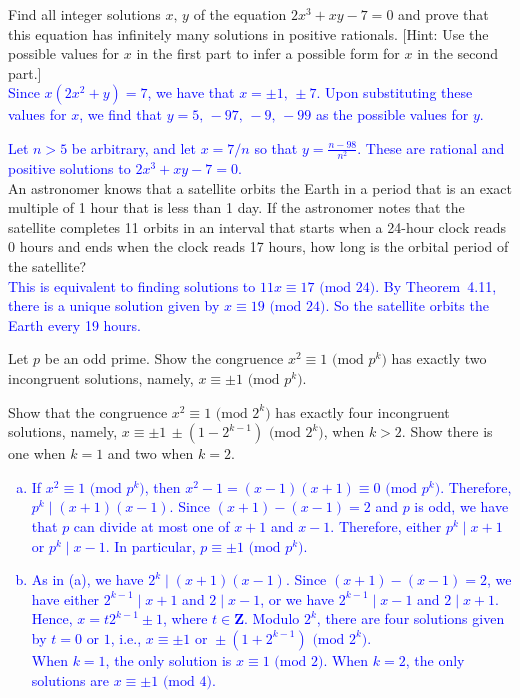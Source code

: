 \documentclass[a4paper,11pt]{article}
\theoremstyle{mythm}
\theoremstyle{mydef}
\newcommand{\blue}[1]{\textcolor{blue}{#1}}
\renewcommand{\pmod}[1]{\text{ (mod $#1$)}}
\newcommand{\Z}{\mathbf{Z}}
\begin{document}
 Find all integer solutions $x,\,y$ of the equation
$2x^3+xy-7=0$ and prove that this equation has infinitely many solutions in
positive rationals. [Hint: Use the possible values for $x$ in the first part to
infer a possible form for $x$ in the second part.] \\

\blue{Since $x(2x^2+y)=7$, we have that $x=\pm1,\,\pm7$. Upon substituting
  these values for $x$, we find that $y=5,\,-97,\,-9,\,-99$ as the possible
  values for $y$.}

\blue{Let $n>5$ be arbitrary, and let $x=7/n$ so that $y=\frac{n-98}{n^2}$.
  These are rational and positive solutions to $2x^3+xy-7=0$.} \\

 An astronomer knows that a satellite orbits the
Earth in a period that is an exact multiple of 1 hour that is less than 1 day.
If the astronomer notes that the satellite completes 11 orbits in an interval
that starts when a 24-hour clock reads 0 hours and ends when the clock reads 17
hours, how long is the orbital period of the satellite? \\

\blue{This is equivalent to finding solutions to $11x \equiv 17 \pmod{24}$. By
  Theorem~4.11, there is a unique solution given by $x \equiv 19 \pmod{24}$. So
  the satellite orbits the Earth every 19 hours.} \\

\begin{enumerate*}[{\bf (a)}]
\item Let $p$ be an odd prime. Show the congruence $x^2 \equiv 1\pmod{p^k}$ has
  exactly two incongruent solutions, namely, $x \equiv \pm1 \pmod{p^k}$.
\item Show that the congruence $x^2 \equiv 1 \pmod{2^k}$ has exactly four
  incongruent solutions, namely, $x \equiv \pm1\,\pm(1-2^{k-1}) \pmod{2^k}$,
  when $k>2$. Show there is one when $k=1$ and two when $k=2$.
\end{enumerate*}

\blue{
  \begin{enumerate}[(a)]
  \item If $x^2 \equiv 1 \pmod{p^k}$, then $x^2-1 = (x-1)(x+1) \equiv 0
    \pmod{p^k}$. Therefore, $p^k \mid (x+1)(x-1)$. Since $(x+1)-(x-1)=2$ and $p$
    is odd, we have that $p$ can divide at most one of $x+1$ and $x-1$.
    Therefore, either $p^k \mid x+1$ or $p^k \mid x-1$. In particular, $p \equiv
    \pm1\pmod{p^k}$.
  \item As in (a), we have $2^k \mid (x+1)(x-1)$. Since $(x+1)-(x-1)=2$, we have
    either $2^{k-1} \mid x+1$ and $2 \mid x-1$, or we have $2^{k-1} \mid x-1$
    and $2 \mid x+1$. Hence, $x=t2^{k-1} \pm 1$, where $t \in \Z$. Modulo $2^k$,
    there are four solutions given by $t=0\text{ or }1$, i.e., $x \equiv
    \pm1\text{ or }\pm(1+2^{k-1}) \pmod{2^k}$. \\
    When $k=1$, the only solution is $x \equiv 1 \pmod{2}$. When $k=2$, the only
    solutions are $x \equiv \pm1\pmod{4}$.
  \end{enumerate}
}
\end{document}
